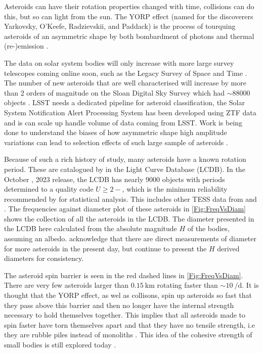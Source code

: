 \documentclass{UCreport}
\begin{document}
Asteroids can have their rotation properties changed with time, collisions can do this, but so can light from the sun.
The YORP effect (named for the discoverers Yarkovsky, O'Keefe, Radzievskii, and Paddack) is the process of tourquing asteroids of an asymmetric shape by both bombardment of photons and thermal (re-)emission \citep{Rubincam2000}.

The data on solar system bodies will only increase with more large survey telescopes coming online soon, such as the Legacy Survey of Space and Time \citep[LSST][]{LSST2019}.
The number of new asteroids that are well characterised will increase by more than 2 orders of magnitude on the Sloan Digital Sky Survey \citep[SDSS][]{York2000} which had $\sim 88000$ objects \citet{Parker2008}.
LSST needs a dedicated pipeline for asteroid classification, the Solar System Notification Alert Processing System \citep[SNAPS][]{Trilling2023} has been developed using ZTF data and is can scale up handle volume of data coming from LSST.
Work is being done to understand the biases of how  asymmetric shape high amplitude variations can lead to selection effects of such large sample of asteroids \citet{Levine2023}.

Because of such a rich history of study, many asteroids have a known rotation period.
These are catalogued by \citet{Warner2009} %
in the Light Curve Database (LCDB).
In the October , 2023 release, the LCDB has nearly 9000 objects with periods determined to a quality code $U\geq 2-$, which is the minimum reliability recommended by \citeauthor{Warner2009} for statistical analysis.
This includes other TESS data from \citet{Pal2020} and \citet{Woods2021}.
The frequencies against diameter plot of these asteroids in \autoref{Fig:FreqVsDiam} shows the collection of all the asteroids in the LCDB.
The diameter presented in the LCDB here calculated from the absolute magnitude $H$ of the bodies, assuming an albedo.
\citeauthor{Warner2009} acknowledge that there are direct measurements of diameter for more asteroids in the present day, but continue to present the $H$ derived diameters for consistency.

The asteroid spin barrier \citep{Pravec2000} is seen in the red dashed lines in \autoref{Fig:FreqVsDiam}.
There are very few asteroids larger than $\qty{0.15}{\kilo\metre}$ rotating faster than $\sim \qty{10}{\per\day}$.
It is thought that the YORP effect, as wel as collisons, spin up asteroids so fast that they pass above this barrier and then no longer have the internal strength necessary to hold themselves together.
This implies that all asteroids made to spin faster have torn themselves apart and that they have no tensile strength, i.e they are rubble piles instead of monoliths \citep{Harris1996}. 
This idea of the cohesive strength of small bodies is still explored today \citep[e.g.][for V-type asteroids]{Oszkiewicz2020}.
\end{document}
